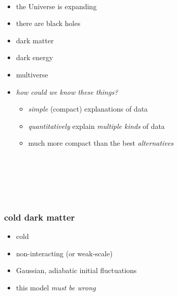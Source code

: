 \documentclass{beamer}
\begin{document}
\whiteonblack

{\begin{frame}[plain]~\end{frame}}

\begin{frame}
\begin{itemize}
\item the Universe is expanding
\item there are black holes
\item dark matter
\item dark energy
\item multiverse
\item \emph{how could we know these things?}
  \begin{itemize}
  \item \emph{simple} (compact) explanations of data
  \item \emph{quantitatively} explain \emph{multiple kinds} of data
  \item much more compact than the best \emph{alternatives}
  \end{itemize}
\end{itemize}
\end{frame}

{\begin{frame}[plain]~\end{frame}}

{\begin{frame}[plain]~\end{frame}}

{\begin{frame}[plain]~\end{frame}}

\begin{frame}
\frametitle{cold dark matter}
\begin{itemize}
\item cold
\item non-interacting (or weak-scale)
\item Gaussian, adiabatic initial fluctuations
\item this model \emph{must be wrong}
\end{itemize}
\end{frame}
\end{document}
